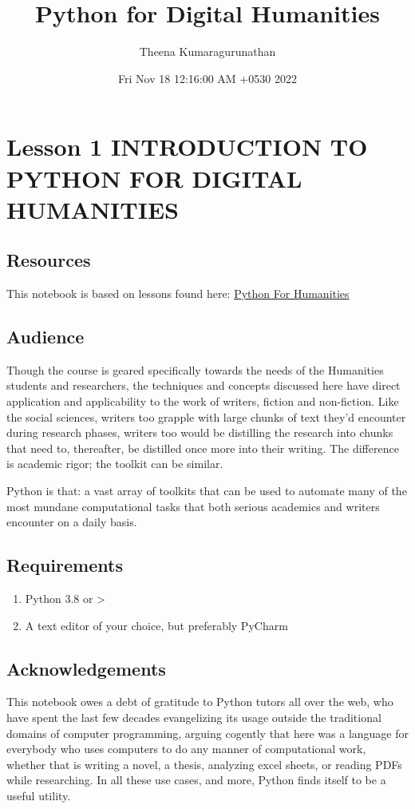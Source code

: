 \documentclass[11pt]{article}
\author{Theena Kumaragurunathan}
\date{Fri Nov 18 12:16:00 AM +0530 2022}
\title{Python for Digital Humanities}
\begin{document}
\maketitle
\tableofcontents


\section{Lesson 1 INTRODUCTION TO PYTHON FOR DIGITAL HUMANITIES}
\label{sec:org39610b9}
\subsection{Resources}
\label{sec:orgbdf2fea}
This notebook is based on lessons found here: \href{https://pythonhumanities.com/}{Python For Humanities}
\subsection{Audience}
\label{sec:org9700daa}
Though the course is geared specifically towards the needs of the Humanities students and researchers, the techniques and concepts discussed here have direct application and applicability to the work of writers, fiction and non-fiction. Like the social sciences, writers too grapple with large chunks of text they'd encounter during research phases, writers too would be distilling the research into chunks that need to, thereafter, be distilled once more into their writing. The difference is academic rigor; the toolkit can be similar.

Python is that: a vast array of toolkits that can be used to automate many of the most mundane computational tasks that both serious academics and writers encounter on a daily basis.
\subsection{Requirements}
\label{sec:org3872234}
\begin{enumerate}
\item Python 3.8 or >
\item A text editor of your choice, but preferably PyCharm
\end{enumerate}

\subsection{Acknowledgements}
\label{sec:org6e1d77d}
This notebook owes a debt of gratitude to Python tutors all over the web,
who have spent the last few decades evangelizing its usage outside the
traditional domains of computer programming, arguing cogently that here
was a language for everybody who uses computers to do any manner of
computational work, whether that is writing a novel, a thesis, analyzing
excel sheets, or reading PDFs while researching. In all these use cases,
and more, Python finds itself to be a useful utility.
\end{document}
